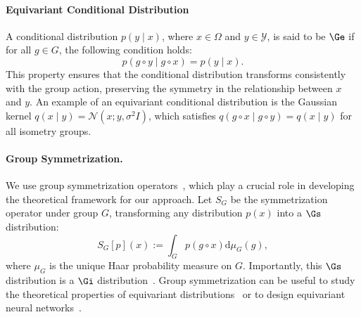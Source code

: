 \paragraph{Equivariant Conditional Distribution} 
A conditional distribution \( p(y \mid x) \), where \( x \in \Omega \) and \( y \in \mathcal{Y} \), is said to be \(\Ge\) if for all \( g \in G \), the following condition holds:
\[
p(g \circ y \mid g \circ x) = p(y \mid x).
\]
This property ensures that the conditional distribution transforms consistently with the group action, preserving the symmetry in the relationship between \( x \) and \( y \). An example of an equivariant conditional distribution is the Gaussian kernel \( q(x \mid y) = \mathcal{N}(x; y, \sigma^2 I) \), which satisfies \( q(g \circ x \mid g \circ y) = q(x \mid y)\) for all isometry groups. 

\paragraph{Group Symmetrization.}  
We use group symmetrization operators~, which play a crucial role in developing the theoretical framework for our approach. Let \( S_G \) be the symmetrization operator under group \( G \), transforming any distribution \( p(x) \) into a \(\Gs\) distribution:
\begin{equation}
    S_G[p](x) := \int_G p(g \circ x) \mathrm{d}\mu_G(g), \nonumber
\end{equation}
where \( \mu_G \) is the unique Haar probability measure on \( G \). Importantly, this \(\Gs\) distribution is a \(\Gi\) distribution~. Group symmetrization can be useful to study the theoretical properties of equivariant distributions~ or to design equivariant neural networks~.


